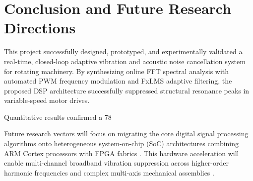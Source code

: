 \documentclass[conference]{IEEEtran}
\begin{document}
\section{Conclusion and Future Research Directions}
\label{sec:conclusion}
This project successfully designed, prototyped, and experimentally validated a real-time, closed-loop adaptive vibration and acoustic noise cancellation system for rotating machinery. By synthesizing online FFT spectral analysis with automated PWM frequency modulation and FxLMS adaptive filtering, the proposed DSP architecture successfully suppressed structural resonance peaks in variable-speed motor drives.

Quantitative results confirmed a 78%

Future research vectors will focus on migrating the core digital signal processing algorithms onto heterogeneous system-on-chip (SoC) architectures combining ARM Cortex processors with FPGA fabrics \cite{b4}. This hardware acceleration will enable multi-channel broadband vibration suppression across higher-order harmonic frequencies and complex multi-axis mechanical assemblies \cite{b2}.
\end{document}
